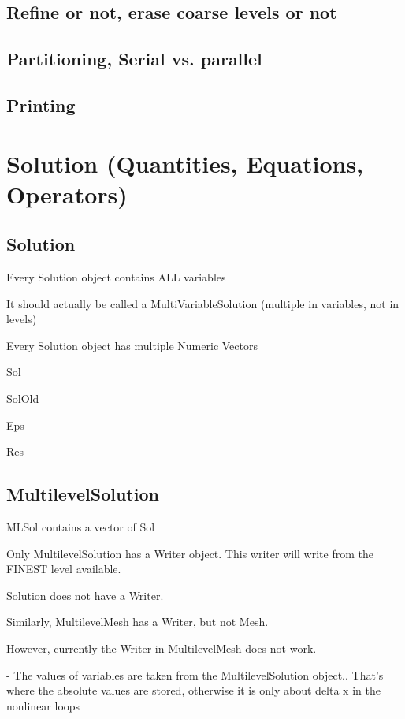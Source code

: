 \documentclass[10pt]{book}
\begin{document}
   \section{Refine or not, erase coarse levels or not}
  
   \section{Partitioning, Serial vs. parallel}
   
   \section{Printing}
   
   
   
  \chapter{Solution (Quantities, Equations, Operators)}

  \section{Solution}
  
  Every Solution object contains ALL variables
  
  It should actually be called a MultiVariableSolution (multiple in variables, not in levels)
  
  
  Every Solution object has multiple Numeric Vectors 
  
  Sol 
  
  SolOld
  
  Eps
  
  Res
  
  
  
  \section{MultilevelSolution}
  
     MLSol contains a vector of Sol
   
   Only MultilevelSolution has a Writer object. This writer will write from the FINEST level available.
   
   Solution does not have a Writer.
   
   Similarly, MultilevelMesh has a Writer, but not Mesh.
  
   However, currently the Writer in MultilevelMesh does not work.
   

   - The values of variables are taken from the MultilevelSolution object..
     That's where the absolute values are stored, otherwise it is only about delta x in the nonlinear loops
\end{document}
